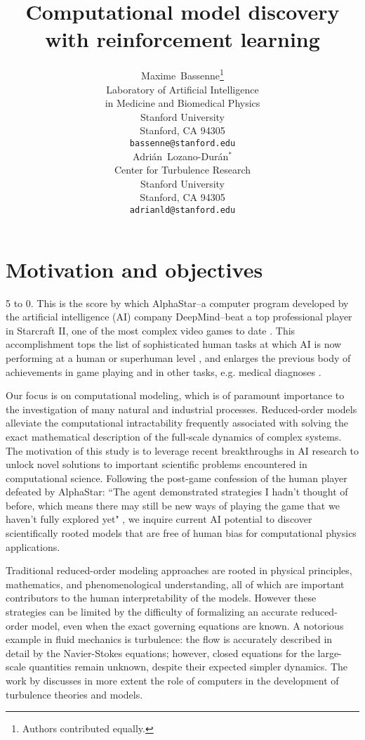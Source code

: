 \documentclass{article}
\title{Computational model discovery\\ with reinforcement learning}
\author{
  Maxime~Bassenne\thanks{Authors contributed equally.}\\
  Laboratory of Artificial Intelligence\\ in Medicine and Biomedical Physics\\
  Stanford University\\
  Stanford, CA 94305\\
  \texttt{bassenne@stanford.edu} \\
\And
  Adri\'an~Lozano-Dur\'an$^*$\\
  Center for Turbulence Research\\
  Stanford University\\
  Stanford, CA 94305\\
  \texttt{adrianld@stanford.edu} \\
}
\begin{document}
\maketitle






\section{Motivation and objectives}


5 to 0. This is the score by which AlphaStar--a computer program
developed by the artificial intelligence (AI) company DeepMind--beat a
top professional player in Starcraft II, one of the most complex video
games to date \citep{alphastarblog}. This accomplishment tops the list
of sophisticated human tasks at which AI is now performing at a human
or superhuman level \citep{AIreport2019}, and enlarges the previous
body of achievements in game playing
\citep{silver2017mastering,silver2018general} and in other tasks,
e.g. medical diagnoses
\citep{esteva2017dermatologist,raumviboonsuk2019deep,nagpal2019development}.

Our focus is on computational modeling, which is of paramount
importance to the investigation of many natural and industrial
processes. Reduced-order models alleviate the computational
intractability frequently associated with solving the exact
mathematical description of the full-scale dynamics of complex
systems.  The motivation of this study is to leverage recent
breakthroughs in AI research to unlock novel solutions to important
scientific problems encountered in computational science. Following
the post-game confession of the human player defeated by AlphaStar:
``The agent demonstrated strategies I hadn't thought of before, which
means there may still be new ways of playing the game that we haven’t
fully explored yet" \citep{alphastarblog}, we inquire current AI
potential to discover scientifically rooted models that are free of
human bias for computational physics applications.

Traditional reduced-order modeling approaches are rooted in physical
principles, mathematics, and phenomenological understanding, all of
which are important contributors to the human interpretability of the
models. However these strategies can be limited by the difficulty of
formalizing an accurate reduced-order model, even when the exact
governing equations are known. A notorious example in fluid mechanics
is turbulence: the flow is accurately described in detail by the
Navier-Stokes equations; however, closed equations for the large-scale
quantities remain unknown, despite their expected simpler dynamics.
The work by \citet{Jimenez2020} discusses in more extent the
role of computers in the development of turbulence theories and
models.
\end{document}
